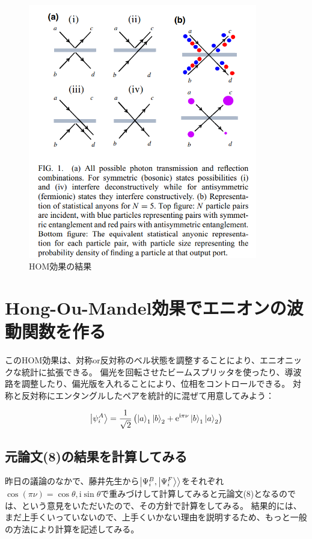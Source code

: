 \documentclass[a4paper,11pt]{jsarticle}
\numberwithin{equation}{section}
\renewcommand{\i}{\mathrm{i}}
\begin{document}
\begin{figure}[htbp]
  \begin{center}
  \includegraphics[width=100mm]{fig1.png}
  \caption{HOM効果の結果}
  \end{center}
  \end{figure}
  


\section{Hong-Ou-Mandel効果でエニオンの波動関数を作る}
このHOM効果は、対称or反対称のベル状態を調整することにより、エニオニックな統計に拡張できる。
偏光を回転させたビームスプリッタを使ったり、導波路を調整したり、偏光版を入れることにより、位相をコントロールできる。
対称と反対称にエンタングルしたペアを統計的に混ぜて用意してみよう：

\begin{align}
  \ket{\psi_i^A} = \frac{1}{\sqrt{2}} \left( \ket{a}_1 \ket{b}_2 + \mathrm{e}^{\i \pi \nu} \ket{b}_1 \ket{a}_2 \right)
\end{align}

\subsection{元論文(8)の結果を計算してみる}
昨日の議論のなかで、藤井先生から$\ket{\Psi_i^B,\ket{\Psi_i^F}}$をそれぞれ$\cos(\pi\nu)=\cos{\theta},\mathrm{i}\sin{\theta}$で重みづけして計算してみると元論文(8)となるのでは、という意見をいただいたので、その方針で計算をしてみる。
結果的には、まだ上手くいっていないので、上手くいかない理由を説明するため、もっと一般の方法により計算を記述してみる。\\
\end{document}

